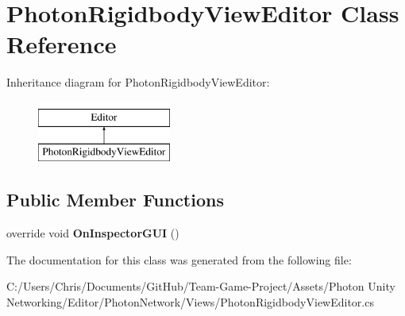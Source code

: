 \hypertarget{class_photon_rigidbody_view_editor}{}\section{Photon\+Rigidbody\+View\+Editor Class Reference}
\label{class_photon_rigidbody_view_editor}
Inheritance diagram for Photon\+Rigidbody\+View\+Editor\+:\begin{figure}[H]
\begin{center}
\leavevmode
\includegraphics[height=2.000000cm]{class_photon_rigidbody_view_editor}
\end{center}
\end{figure}
\subsection*{Public Member Functions}
\begin{DoxyCompactItemize}
\item 
override void {\bfseries On\+Inspector\+G\+UI} ()\hypertarget{class_photon_rigidbody_view_editor_a4bbfb02151e5116f7555ae9f31e9a91d}{}\label{class_photon_rigidbody_view_editor_a4bbfb02151e5116f7555ae9f31e9a91d}

\end{DoxyCompactItemize}


The documentation for this class was generated from the following file\+:\begin{DoxyCompactItemize}
\item 
C\+:/\+Users/\+Chris/\+Documents/\+Git\+Hub/\+Team-\/\+Game-\/\+Project/\+Assets/\+Photon Unity Networking/\+Editor/\+Photon\+Network/\+Views/Photon\+Rigidbody\+View\+Editor.\+cs\end{DoxyCompactItemize}

